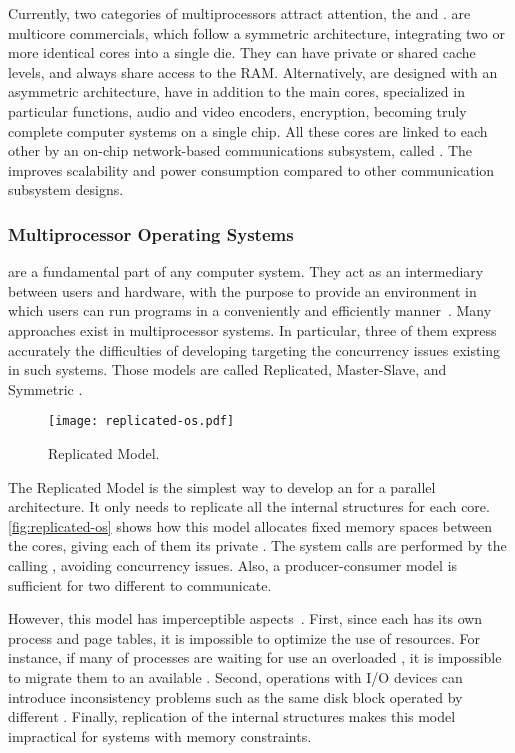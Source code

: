 			Currently, two categories of multiprocessors attract attention, the \cmp and \mpsoc.
			\cmps are multicore commercials, which follow a symmetric architecture,
			integrating two or more identical cores into a single die.
			They can have private or shared cache levels, and always share access
			to the RAM.
			Alternatively, \mpsocs are designed with an asymmetric architecture,
			have in addition to the main cores, specialized \cpus in particular
			functions, \eg audio and video encoders, encryption, becoming truly
			complete computer systems on a single chip.
			All these cores are linked to each other by an on-chip network-based
			communications subsystem, called \noc.
			The \noc improves scalability and power consumption compared to other
			communication subsystem designs.

		\subsubsection{Multiprocessor Operating Systems}
		\label{sec.multiprocessor-os}

			\oss are a fundamental part of any computer system.
			They act as an intermediary between users and hardware, with the
			purpose to provide an environment in which users can run programs
			in a conveniently and efficiently manner~\cite{Silberschatz:9ed}.
			Many \os approaches exist in multiprocessor systems.
			In particular, three of them express accurately the difficulties
			of developing \oss targeting the concurrency issues existing in
			such systems.
			Those models are called Replicated, Master-Slave, and Symmetric \os.

			\begin{figure}[t]
				\centering%
				\caption{Replicated \os Model.}%
				\label{fig:replicated-os}%
				\texttt{[image: replicated-os.pdf]}%
			\end{figure}

			The Replicated Model is the simplest way to develop an \os for a
			parallel architecture.
			It only needs to replicate all the internal \os structures for each core.
			\autoref{fig:replicated-os} shows how this model allocates fixed memory spaces
			between the cores, giving each of them its private \os.
			The system calls are performed by the calling \cpu, avoiding concurrency issues.
			Also, a producer-consumer model is sufficient for two different \cpus to communicate.

			However, this model has imperceptible aspects~\cite{tanenbaum:4ed}.
			First, since each \cpu has its own process and page tables, it is impossible
			to optimize the use of resources.
			For instance, if many of processes are waiting for use an overloaded \cpu,
			it is impossible to migrate them to an available \cpu.
			Second, operations with I/O devices can introduce inconsistency problems
			such as the same disk block operated by different \cpus.
			Finally, replication of the internal \os structures makes this model
			impractical for systems with memory constraints.

